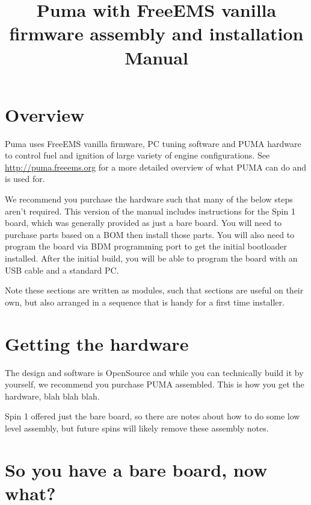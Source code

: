 \documentclass[12pt,a4paper,titlepage]{article}
\author{}
\title{Puma with FreeEMS vanilla firmware assembly and  installation Manual}
\begin{document}
\maketitle
\pagebreak

\tableofcontents
\thispagestyle{empty}
\pagebreak

\section{Overview}

Puma uses FreeEMS vanilla firmware, PC tuning software and PUMA hardware to control fuel and ignition of large variety of engine configurations. See \url{http://puma.freeems.org} for a more detailed overview of what PUMA can do and is used for. 

We recommend you purchase the hardware such that many of the below steps aren't required. This version of the manual includes instructions for the Spin 1 board, which was generally provided as just a bare board. You will need to purchase parts based on a BOM then install those parts. You will also need to program the board via BDM programming port to get the initial bootloader installed. After the initial build, you will be able to program the board with an USB cable and a standard PC.

Note these sections are written as modules, such that sections are useful on their own, but also arranged in a sequence that is handy for a first time installer. 

\section{Getting the hardware}

The design and software is OpenSource and while you can technically build it by yourself, we recommend you purchase PUMA assembled. This is how you get the hardware, blah blah blah.

Spin 1 offered just the bare board, so there are notes about how to do some low level assembly, but future spins will likely remove these assembly notes. 

\section{So you have a bare board, now what?}
\end{document}
